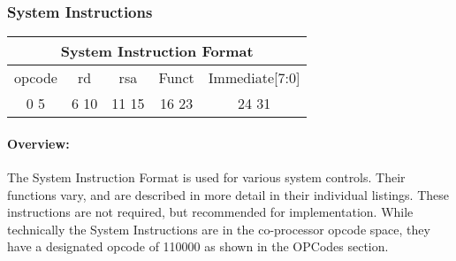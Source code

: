 \documentclass[letterpaper, 11pt]{article}
\begin{document}
\newpage
\subsubsection{System Instructions}
\begin{center}
	\begin{tabular}{|c|c|c|c|c|}
		\multicolumn{5}{c}{System Instruction Format}\\ \hline
			\hspace{2pt} opcode \hspace{2pt} & \hspace{5pt} rd \hspace{5pt} &  \hspace{4pt} rsa \hspace{4pt} & \hspace{10pt}Funct  \hspace{10pt} & \hspace{8pt} Immediate[7:0] \hspace{8pt}   \\	\hline
			0 \hfill 5&6 \hfill 10&11 \hfill 15&16 \hfill  23&24 \hfill 31\\ \hline
		
	\end{tabular}
\end{center}
\paragraph{Overview:} The System Instruction Format is used for various system controls. Their functions
vary, and are described in more detail in their individual listings.
These instructions are not required, but recommended for implementation.
While technically the System Instructions are in the co-processor opcode space, they have
a designated opcode of 110000 as shown in the OPCodes section.
\end{document}
